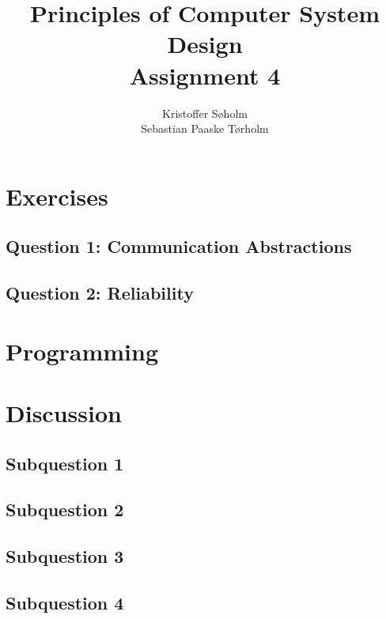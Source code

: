 \documentclass[11pt,a4paper]{article}
\title{Principles of Computer System Design\\Assignment 4}
\author{Kristoffer Søholm\\Sebastian Paaske Tørholm}
\begin{document}
\maketitle

\section{Exercises}
\subsection{Question 1: Communication Abstractions}


\subsection{Question 2: Reliability} 


\section{Programming}


\section{Discussion}

\subsection{Subquestion 1}


\subsection{Subquestion 2}

\subsection{Subquestion 3}


\subsection{Subquestion 4}

\end{document}
